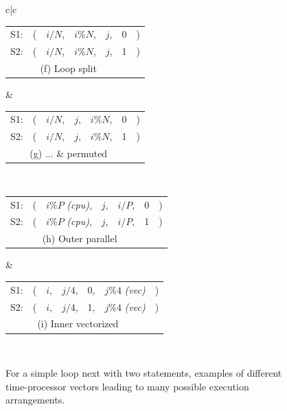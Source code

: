 \begin{figure}
\begin{tabular}{c|c}
    \begin{tabular}{l@{\hspace{4pt}}r@{\hspace{2pt}}c@{\hspace{2pt}}c@{\hspace{2pt}}c@{\hspace{2pt}}c@{\hspace{0pt}}l}
    S1: & (  & $i/N$, & $i\%N$, & $j$, & 0 & ) \\
    S2: & (  & $i/N$, & $i\%N$, & $j$, & 1 & ) \\
    \multicolumn{6}{c}{ (f) Loop split}
   \end{tabular} 
   &
    \begin{tabular}{l@{\hspace{4pt}}r@{\hspace{2pt}}c@{\hspace{2pt}}c@{\hspace{2pt}}c@{\hspace{2pt}}c@{\hspace{0pt}}l}
    S1: & ( & $i/N$, & $j$, & $i\%N$, & 0 & ) \\
    S2: & ( & $i/N$, & $j$, & $i\%N$, & 1 & ) \\
    \multicolumn{6}{c}{ (g) ... \& permuted}
    \end{tabular}  \\\hline
    
    \begin{tabular}{l@{\hspace{4pt}}r@{\hspace{2pt}}c@{\hspace{2pt}}c@{\hspace{2pt}}c@{\hspace{2pt}}c@{\hspace{0pt}}l}
    S1: & ( & $i\%P$ {\it (cpu)}, & $j$, & $i/P$, & 0 & ) \\
    S2: & ( & $i\%P$ {\it (cpu)}, & $j$, & $i/P$, & 1 & ) \\
    \multicolumn{6}{c}{ (h) Outer parallel }
   \end{tabular} 
   &
    \begin{tabular}{l@{\hspace{4pt}}r@{\hspace{2pt}}c@{\hspace{2pt}}c@{\hspace{2pt}}c@{\hspace{2pt}}c@{\hspace{0pt}}l}
    S1: & ( & $i$, & $j/4$, & 0, & $j\%4$ {\it (vec)} & ) \\
    S2: & ( & $i$, & $j/4$, & 1, & $j\%4$ {\it (vec)} & ) \\
    \multicolumn{6}{c}{ (i) Inner vectorized }
   \end{tabular} \\ 

\end{tabular}
 \caption{For a simple loop next with two statements, examples of different time-processor vectors leading to many possible execution arrangements. }
\label{fig:time-processor-vector}
\end{figure}


